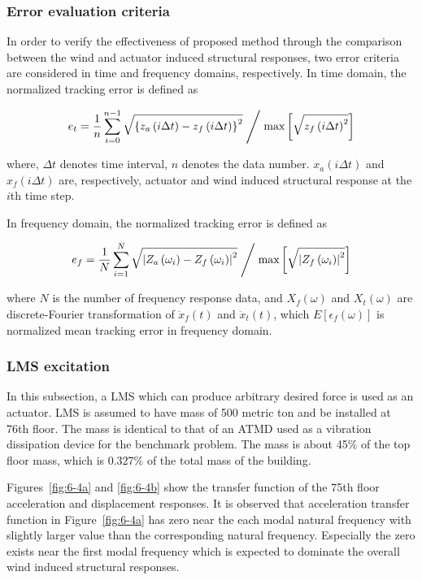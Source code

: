 \subsubsection{Error evaluation criteria}
In order to verify the effectiveness of proposed method through the comparison between the wind and actuator induced structural responses, two error criteria are considered in time and frequency domains, respectively.
In time domain, the normalized tracking error is defined as 

\begin{equation}\label{eq:6-8}
e_{t} = \frac{1}{n}\sum_{i=0}^{n-1}\sqrt{\left\{ z_{a} \left(i\Delta t \right) -z_{f}\left(i\Delta t\right) \right\}^{2}}  \Biggm/ \text{max} \left[\sqrt{z_{f}\left(i\Delta t\right)^{2}} \right]
\end{equation}

where, $\Delta t$ denotes time interval, $n$ denotes the data number. $x_{a}\left(i\Delta t\right)$ and $x_{f}\left(i\Delta t\right)$ are, respectively, actuator and wind induced structural response at the $i$th time step.

In frequency domain, the normalized tracking error is defined as

\begin{equation}\label{eq:6-9}
e_{f} = \frac{1}{N}\sum_{i=1}^{N}\sqrt{\left| Z_{a} \left(\omega_{i} \right) -Z_{f}\left(\omega_{i}\right) \right|^{2}} \Biggm/ \text{max} \left[\sqrt{\left|Z_{f}\left(\omega_{i}\right)\right|^{2}} \right]
\end{equation}

where $N$ is the number of frequency response data, and $X_{f}(\omega)$ and $X_{t}(\omega)$ are discrete-Fourier transformation of $\ddot{x}_{f}(t)$ and $\ddot{x}_{t}(t)$, which $E\left[\epsilon_{f}(\omega)\right]$ is normalized mean tracking error in frequency domain.

\subsubsection{LMS excitation}
In this subsection, a LMS which can produce arbitrary desired force is used as an actuator. LMS is assumed to have mass of 500 metric ton and be installed at 76th floor. The mass is identical to that of an ATMD used as a vibration dissipation device for the benchmark problem. The mass is about 45\% of the top floor mass, which is 0.327\% of the total mass of the building.

Figures~\ref{fig:6-4a} and \ref{fig:6-4b} show the transfer function of the 75th floor acceleration and displacement responses. It is observed that acceleration transfer function in Figure~\ref{fig:6-4a} has zero near the each modal natural frequency with slightly larger value than the corresponding natural frequency. Especially the zero exists near the first modal frequency which is expected to dominate the overall wind induced structural responses.

